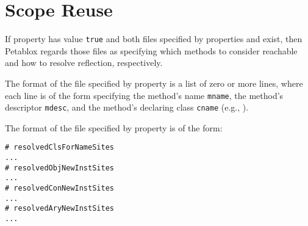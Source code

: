 %
%

\section{Scope Reuse}
\label{sec:scope-reuse}

If property  has value {\tt true} and both
files specified by properties  and
 exist, then Petablox regards those files as
specifying which methods to consider reachable and how to resolve
reflection, respectively.

The format of the file specified by property 
is a list of zero or more lines, where each line is of the form
specifying the method's name {\tt mname}, the method's descriptor
{\tt mdesc}, and the method's declaring class {\tt cname} (e.g.,
\code{main:([Ljava/lang/String;)V@foo.bar.Main}).

The format of the file specified by property 
is of the form:

\begin{framed}
\begin{verbatim}
# resolvedClsForNameSites
...
# resolvedObjNewInstSites
...
# resolvedConNewInstSites
...
# resolvedAryNewInstSites
...
\end{verbatim}
\end{framed}

